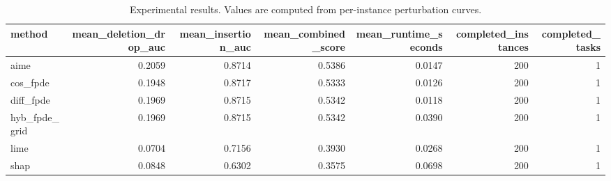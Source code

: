 \begin{table}[t]
\caption{Experimental results. Values are computed from per-instance perturbation curves.}
\label{tab:main_results_computed}
\centering
\begin{tabular}{lrrrrrr}
\toprule
method & mean\_deletion\_drop\_auc & mean\_insertion\_auc & mean\_combined\_score & mean\_runtime\_seconds & completed\_instances & completed\_tasks \\
\midrule
aime & 0.2059 & 0.8714 & 0.5386 & 0.0147 & 200 & 1 \\
cos\_fpde & 0.1948 & 0.8717 & 0.5333 & 0.0126 & 200 & 1 \\
diff\_fpde & 0.1969 & 0.8715 & 0.5342 & 0.0118 & 200 & 1 \\
hyb\_fpde\_grid & 0.1969 & 0.8715 & 0.5342 & 0.0390 & 200 & 1 \\
lime & 0.0704 & 0.7156 & 0.3930 & 0.0268 & 200 & 1 \\
shap & 0.0848 & 0.6302 & 0.3575 & 0.0698 & 200 & 1 \\
\bottomrule
\end{tabular}

\end{table}
